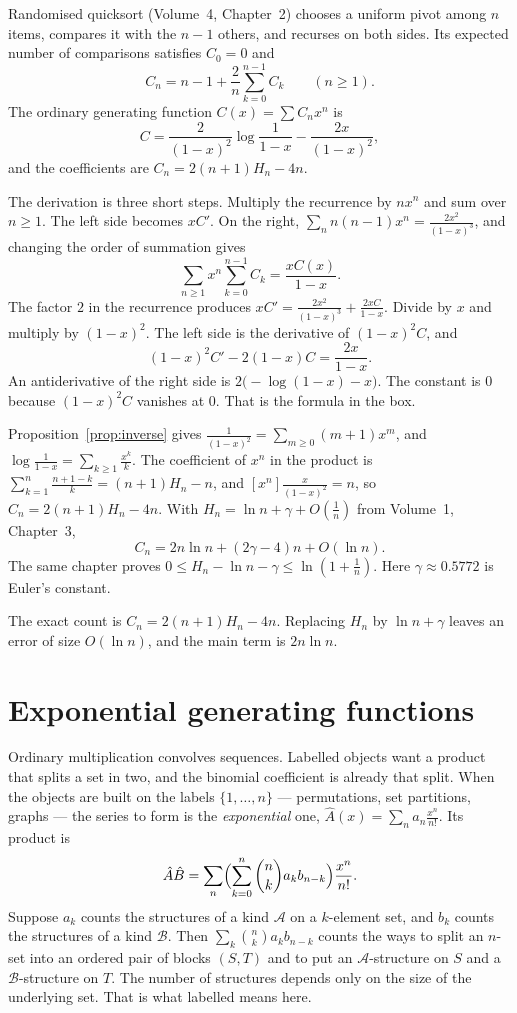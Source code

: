 \begin{example}[quicksort]\label{ex:quicksortexact}
Randomised quicksort (Volume~4, Chapter~2) chooses a uniform pivot among $n$ items, compares it with the $n-1$ others, and recurses on both sides. Its expected number of comparisons satisfies $C_0=0$ and
\[
C_n=n-1+\frac2n\sum_{k=0}^{n-1}C_k\qquad(n\ge1).
\]
The ordinary generating function $C(x)=\sum C_nx^n$ is
\[
C=\frac2{(1-x)^2}\log\frac1{1-x}-\frac{2x}{(1-x)^2},
\]
and the coefficients are $C_n=2(n+1)H_n-4n$.
\end{example}

The derivation is three short steps. Multiply the recurrence by $nx^n$ and sum over $n\ge1$. The left side becomes $xC'$. On the right, $\sum_nn(n-1)x^n=\frac{2x^2}{(1-x)^3}$, and changing the order of summation gives
\[
\sum_{n\ge1}x^n\sum_{k=0}^{n-1}C_k=\frac{xC(x)}{1-x}.
\]
The factor $2$ in the recurrence produces $xC'=\frac{2x^2}{(1-x)^3}+\frac{2xC}{1-x}$. Divide by $x$ and multiply by $(1-x)^2$. The left side is the derivative of $(1-x)^2C$, and
\[
(1-x)^2C'-2(1-x)C=\frac{2x}{1-x}.
\]
An antiderivative of the right side is $2\bigl(-\log(1-x)-x\bigr)$. The constant is $0$ because $(1-x)^2C$ vanishes at $0$. That is the formula in the box.

Proposition~\ref{prop:inverse} gives $\frac1{(1-x)^2}=\sum_{m\ge0}(m+1)x^m$, and $\log\frac1{1-x}=\sum_{k\ge1}\frac{x^k}k$. The coefficient of $x^n$ in the product is $\sum_{k=1}^n\frac{n+1-k}k=(n+1)H_n-n$, and $[x^n]\frac{x}{(1-x)^2}=n$, so $C_n=2(n+1)H_n-4n$. With $H_n=\ln n+\gamma+O(\frac1n)$ from Volume~1, Chapter~3,
\[
C_n=2n\ln n+(2\gamma-4)n+O(\ln n).
\]
The same chapter proves $0\le H_n-\ln n-\gamma\le\ln(1+\frac1n)$. Here $\gamma\approx0.5772$ is Euler's constant.

The exact count is $C_n=2(n+1)H_n-4n$. Replacing $H_n$ by $\ln n+\gamma$ leaves an error of size $O(\ln n)$, and the main term is $2n\ln n$.

\section{Exponential generating functions}

Ordinary multiplication convolves sequences. Labelled objects want a product that splits a set in two, and the binomial coefficient is already that split. When the objects are built on the labels $\{1,\dots,n\}$ --- permutations, set partitions, graphs --- the series to form is the \emph{exponential} one, $\hat A(x)=\sum_na_n\frac{x^n}{n!}$. Its product is
\[
\hat A\hat B=\sum_n\Bigl(\sum_{k=0}^n\binom nka_kb_{n-k}\Bigr)\frac{x^n}{n!}.
\]
Suppose $a_k$ counts the structures of a kind $\mathcal A$ on a $k$-element set, and $b_k$ counts the structures of a kind $\mathcal B$. Then $\sum_k\binom nka_kb_{n-k}$ counts the ways to split an $n$-set into an ordered pair of blocks $(S,T)$ and to put an $\mathcal A$-structure on $S$ and a $\mathcal B$-structure on $T$. The number of structures depends only on the size of the underlying set. That is what labelled means here.

